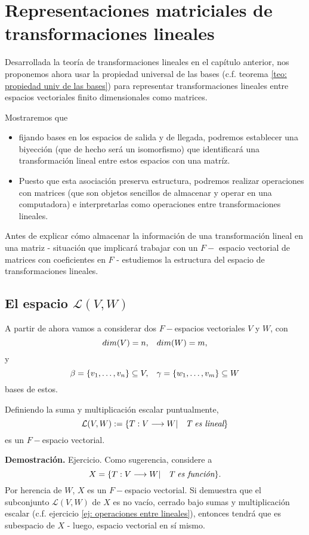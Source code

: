 \chapter{Representaciones matriciales de transformaciones lineales}
Desarrollada la teoría de transformaciones lineales en
el capítulo anterior, nos proponemos ahora usar la propiedad
universal de las bases (c.f. teorema
\ref{teo: propiedad univ de las bases}) para representar 
transformaciones lineales entre espacios vectoriales finito dimensionales
como matrices. 

Mostraremos que
\begin{itemize}
	\item fijando bases en los espacios de salida y de llegada,
	podremos establecer una biyección (que de hecho será un isomorfismo)
	que identificará una transformación lineal entre estos espacios
	con una matríz. 
	\item Puesto que esta asociación preserva estructura, podremos 
	realizar operaciones con matrices (que son objetos sencillos de 
	almacenar y operar en una computadora) e interpretarlas como
	operaciones entre transformaciones lineales.
\end{itemize}

Antes de explicar cómo almacenar la información de una transformación
lineal en una matriz - situación que implicará trabajar con
un $F-$ espacio vectorial de matrices con coeficientes
en $F$ - estudiemos la estructura del espacio de transformaciones lineales. 

\section{El espacio $\mathcal{L}(V, W)$}
A partir de ahora vamos a considerar dos $F-$espacios vectoriales
$V$ y $W$, con 
\[
dim(V) = n, \hspace{0.3cm} dim(W) = m,
\]
y
\[
\beta= \{ v_{1}, \ldots , v_{n} \} \subseteq V, 
\hspace{0.3cm}
\gamma = \{ w_{1}, \ldots , v_{m} \} \subseteq W
\]
bases de estos. 

\begin{prop}
Definiendo la suma y multiplicación escalar puntualmente, 
\[
\mathcal{L} (V, W) :=
\{ T: V \longrightarrow W  | \hspace{0.2cm} \textit{ T es lineal}  \}
\]
es un $F-$espacio vectorial. 
\end{prop}
\noindent
\textbf{Demostración.}
Ejercicio. Como sugerencia, considere a 
\[
X = 
\{ T: V \longrightarrow W  | \hspace{0.2cm} \textit{ T es función} \}.
\]
Por herencia de $W$, $X$ es un $F-$espacio vectorial.
Si demuestra que el subconjunto $\mathcal{L}(V, W)$ de $X$
es no vacío, cerrado bajo sumas y multiplicación escalar
(c.f. ejercicio \ref{ej: operaciones entre lineales}), entonces
tendrá que es subespacio de $X$ - luego, espacio vectorial en
sí mismo.
\QEDB
\vspace{0.2cm}

